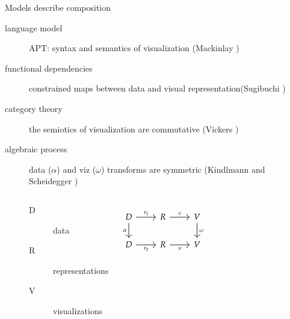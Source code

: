\documentclass[xcolor={dvipsnames}, handout]{beamer}
\begin{document}
\begin{frame}{Models describe composition}
    \begin{description}
        \item[language model] APT: syntax and semantics of visualization (Mackinlay  \cite{mackinlayAutomatingDesignGraphical1986, mackinlayAUTOMATICDESIGNGRAPHICAL1987})
        \item[functional dependencies] constrained maps between data and visual representation(Sugibuchi \cite{sugibuchiFramwork2009}) 
        \item[category theory] the semiotics of visualization are commutative (Vickers \cite{vickersUnderstandingViz2013})
        \item[algebraic process] data ($\alpha$) and viz ($\omega$) transforms are symmetric (Kindlmann and Scheidegger \cite{kindlmannAlgebraicProcessVisualization2014})
        \begin{columns}
       
            \begin{description}
                \item[D] data 
                \item[R] representations
                \item[V] visualizations
            \end{description}
            \begin{equation*}
                \begin{tikzcd}[ampersand replacement=\&]
                    D \arrow[d, "\alpha"'] \arrow[r, "r_1"] \& R \arrow[r, "\nu"]  \& V \arrow[d, "\omega"] \\
                    D \arrow[r, "r_2"']                     \& R \arrow[r, "\nu"'] \& V                    
                \end{tikzcd}
                \end{equation*}
       
        \end{columns} 
     
    \end{description}
\end{frame}
\end{document}
